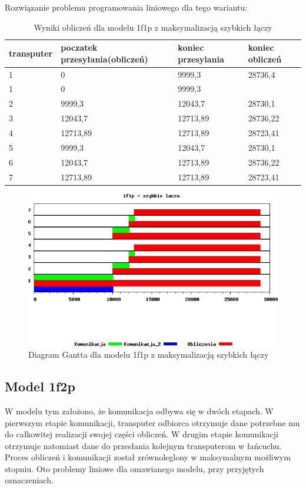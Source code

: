 \documentclass[a4paper,11pt, titlepage]{article}
\begin{document}
Rozwiązanie problemu programowania liniowego dla tego wariantu:
\begin{table}[hp!]
\begin{tabular}{|l|l|l|l|}\hline
transputer & poczatek przesyłania(obliczeń) & koniec przesylania & koniec obliczeń\\ \hline
1	&0			&9999,3		&28736,4\\ \hline
1	&0			&9999,3		&\\ \hline
2	&9999,3		&12043,7	&28730,1\\ \hline
3	&12043,7	&12713,89	&28736,22\\ \hline
4	&12713,89	&12713,89	&28723,41\\ \hline
5	&9999,3		&12043,7	&28730,1\\ \hline
6	&12043,7	&12713,89	&28736,22\\ \hline
7	&12713,89	&12713,89	&28723,41\\ \hline
\end{tabular}
\caption{Wyniki obliczeń dla modelu 1f1p z maksymalizacją szybkich łączy \label{1f1p_lt}}
\end{table}

\begin{figure}[p!]
\includegraphics[width=1.0\textwidth]{wykresy/1p1f_lacza}
\caption{Diagram Gantta dla modelu 1f1p z maksymalizacją szybkich łączy \label{1p1f_l}}
\end{figure}
\clearpage
\subsection{Model 1f2p}
W modelu tym założono, że komunikacja odbywa się w dwóch etapach. W pierwszym etapie komunikacji, transputer odbiorca otrzymuje dane potrzebne mu do całkowitej realizacji swojej części obliczeń. W drugim etapie komunikacji otrzymuje natomiast dane do przesłania kolejnym transputerom w łańcuchu. Proces obliczeń i komunikacji został zrównoleglony w maksymalnym możliwym stopniu. Oto problemy liniowe dla omawianego modelu, przy przyjętych oznaczeniach.
\end{document}
